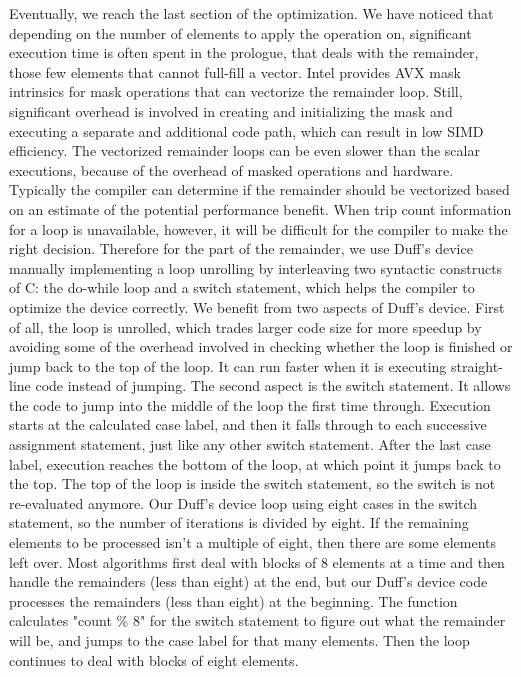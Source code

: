 \documentclass[sigconf]{acmart}
\begin{document}
Eventually, we reach the last section of the optimization. We have
noticed that depending on the number of elements to apply the
operation on, significant execution time is often spent in the
prologue, that deals with the remainder, those few elements that cannot full-fill a vector.
Intel provides AVX mask intrinsics for mask operations that can vectorize the remainder loop.
Still, significant overhead is involved in creating and initializing the mask and
executing a separate and additional code path, which can result in low SIMD efficiency.
%
The vectorized remainder loops can be even slower than the scalar executions,
because of the overhead of masked operations and hardware.
%
Typically the compiler can determine if the remainder should be vectorized
based on an estimate of the potential performance benefit. When trip count information for a
loop is unavailable, however, it will be difficult for the
compiler to make the right decision.
%
Therefore for the part of the remainder, we use Duff's
device~\cite{wiki:duff} manually implementing a loop unrolling by
interleaving two syntactic constructs of C: the do-while loop and a
switch statement, which helps the compiler to optimize the device
correctly.
%
We benefit from two aspects of Duff's device. First of all, the loop is unrolled,
which trades larger code size for more speedup by avoiding some of the overhead
involved in checking whether the loop is finished or jump back to the
top of the loop. 
It can run faster when it is executing straight-line code instead of jumping.
The second aspect is the switch statement. It allows the code to jump into the middle of the
loop the first time through.
Execution starts at the calculated case label, and then it falls through to each successive
assignment statement, just like any other switch statement. 
%
After the last case label, execution reaches the bottom of the loop, at which point it jumps back to the top. The top of the loop is inside the switch statement, so the switch is not re-evaluated anymore.
%
Our Duff's device loop using eight cases in the switch statement, so the number of iterations is divided by eight.
If the remaining elements to be processed isn't a multiple of eight, then there are some elements left over.
Most algorithms first deal with blocks of 8 elements at a time and then handle the remainders (less than eight) at the end,
but our Duff's device code processes the remainders (less than eight) at the beginning. 
The function calculates "count \% 8" for the switch statement to figure out what the remainder will be, and jumps to the case label for that many elements.
Then the loop continues to deal with blocks of eight elements.
\end{document}
